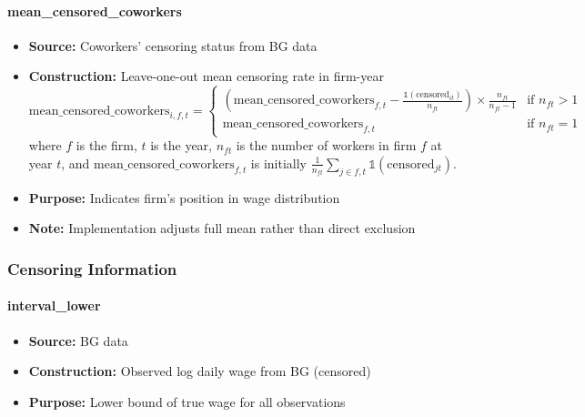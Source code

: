 \documentclass{article}
\begin{document}
\paragraph{mean\_censored\_coworkers}
\begin{itemize}
    \item \textbf{Source:} Coworkers' censoring status from BG data
    \item \textbf{Construction:} Leave-one-out mean censoring rate in firm-year
    \begin{equation}
        \text{mean\_censored\_coworkers}_{i,f,t} = \begin{cases}
            (\text{mean\_censored\_coworkers}_{f,t} - \frac{\mathbb{1}(\text{censored}_{it})}{n_{ft}}) \times \frac{n_{ft}}{n_{ft}-1} & \text{if } n_{ft} > 1\\
            \text{mean\_censored\_coworkers}_{f,t} & \text{if } n_{ft} = 1
        \end{cases}
    \end{equation}
    where $f$ is the firm, $t$ is the year, $n_{ft}$ is the number of workers in firm $f$ at year $t$, and $\text{mean\_censored\_coworkers}_{f,t}$ is initially $\frac{1}{n_{ft}}\sum_{j \in f,t} \mathbb{1}(\text{censored}_{jt})$.
    \item \textbf{Purpose:} Indicates firm's position in wage distribution
    \item \textbf{Note:} Implementation adjusts full mean rather than direct exclusion
\end{itemize}

\subsubsection{Censoring Information}

\paragraph{interval\_lower}
\begin{itemize}
    \item \textbf{Source:} BG data
    \item \textbf{Construction:} Observed log daily wage from BG (censored)
    \item \textbf{Purpose:} Lower bound of true wage for all observations
\end{itemize}
\end{document}
